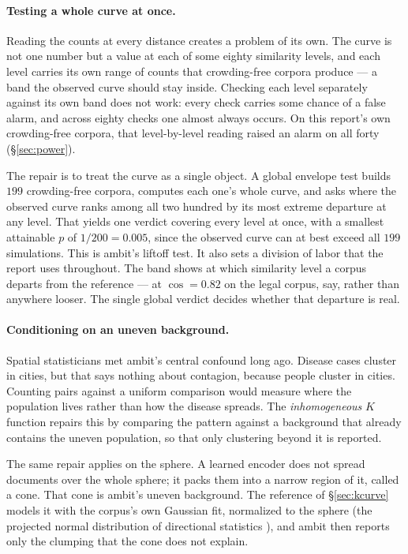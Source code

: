 \documentclass[11pt,letterpaper]{article}
\begin{document}
\paragraph{Testing a whole curve at once.}
Reading the counts at every distance creates a problem of its own. The
curve is not one number but a value at each of some eighty similarity
levels, and each level carries its own range of counts that crowding-free
corpora produce --- a band the observed curve should stay inside. Checking
each level separately against its own band does not work: every check
carries some chance of a false alarm, and across eighty checks one almost
always occurs. On this report's own crowding-free corpora, that
level-by-level reading raised an alarm on all forty (\S\ref{sec:power}).

The repair is to treat the curve as a single object. A global envelope
test \cite{myllymaki2017} builds $199$ crowding-free corpora, computes
each one's whole curve, and asks where the observed curve ranks among all
two hundred by its most extreme departure at any level. That yields one
verdict covering every level at once, with a smallest attainable $p$ of
$1/200 = 0.005$, since the observed curve can at best exceed all $199$
simulations. This is \textsf{ambit}'s liftoff test. It also sets a
division of labor that the report uses throughout. The band shows at which
similarity level a corpus departs from the reference --- at $\cos = 0.82$
on the legal corpus, say, rather than anywhere looser. The single global
verdict decides whether that departure is real.

\paragraph{Conditioning on an uneven background.}
Spatial statisticians met \textsf{ambit}'s central confound long ago.
Disease cases cluster in cities, but that says nothing about contagion,
because people cluster in cities. Counting pairs against a uniform
comparison would measure where the population lives rather than how the
disease spreads. The \emph{inhomogeneous} $K$ function
\cite{baddeley2000} repairs this by comparing the pattern against a
background that already contains the uneven population, so that only
clustering beyond it is reported.

The same repair applies on the sphere. A learned encoder does not spread
documents over the whole sphere; it packs them into a narrow region of
it, called a cone. That cone is \textsf{ambit}'s uneven background. The reference of \S\ref{sec:kcurve} models it with the corpus's own
Gaussian fit, normalized to the sphere (the projected normal
distribution of directional statistics \cite{mardia2000}), and
\textsf{ambit} then reports only the clumping that the cone does not
explain.
\end{document}
